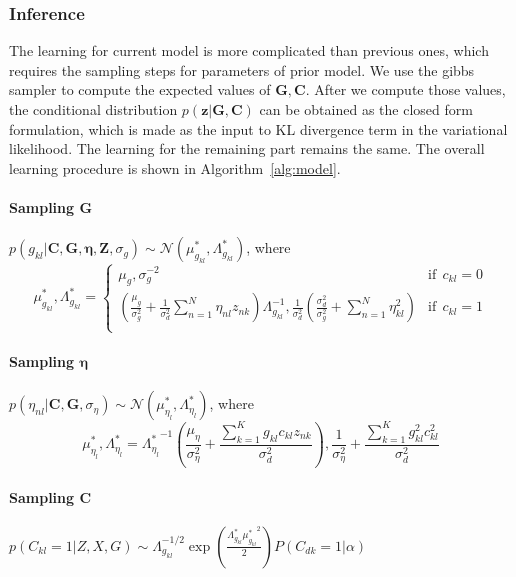 \subsubsection{Inference}
The learning for current model is more complicated than previous ones, which requires the sampling steps for parameters of prior model. We use the gibbs sampler to compute the expected values of $\mathbf{G}, \mathbf{C}$. After we compute those values, the conditional distribution $p(\mathbf{z}|\mathbf{G},\mathbf{C})$ can be obtained as the closed form formulation, which is made as the input to KL divergence term in the variational likelihood. The learning for the remaining part remains the same. The overall learning procedure is shown in Algorithm~\ref{alg:model}.

\paragraph{Sampling $\mathbf{G}$} $p(g_{kl}|\mathbf{C},\mathbf{G},\mathbf{\eta}, \mathbf{Z},\sigma_g)\sim \mathcal{N}(\mu_{g_{kl}}^*, \Lambda_{g_{kl}}^*)$, where
\[ \mu_{g_{kl}}^*, \Lambda_{g_{kl}}^* =
  \begin{cases}
     \mu_g, \sigma_g^{-2}      & \text{if} ~~c_{kl} = 0\\
    \left(\frac{\mu_g}{\sigma_g^2}+\frac{1}{\sigma_d^2}\sum_{n=1}^{N}\eta_{nl}z_{nk}\right)\Lambda_{g_{kl}}^{-1}, \frac{1}{\sigma_d^2}\left(\frac{\sigma_d^2}{\sigma_g^2}+\sum_{n=1}^{N}\eta_{kl}^2\right)  & \text{if}~~ c_{kl} = 1\\
  \end{cases}
\]
\paragraph{Sampling $\mathbf{\eta}$} $p(\eta_{nl}|\mathbf{C},\mathbf{G},\sigma_{\eta})\sim \mathcal{N}(\mu_{\eta_l}^*, \Lambda_{\eta_{l}}^*)$, where
\[
\mu_{\eta_l}^*, \Lambda_{\eta_{l}}^*={\Lambda_{\eta_l}^*}^{-1}\left(\frac{\mu_\eta}{\sigma_{\eta}^2}+\frac{\sum_{k=1}^{K}g_{kl}c_{kl}z_{nk}}{\sigma_d^2}\right),
\frac{1}{\sigma_{\eta}^2}+\frac{\sum_{k=1}^{K}g_{kl}^2c_{kl}^2}{\sigma_d^2}
\]
\paragraph{Sampling $\mathbf{C}$} $p(C_{kl}=1|Z, X, G) \sim \Lambda_{g_{kl}}^{-1/2}\exp(\frac{\Lambda_{g_{kl}}^{\ast}{\mu_{g_{kl}}^{\ast}}^2}{2})P(C_{dk}=1|\alpha)$ 


